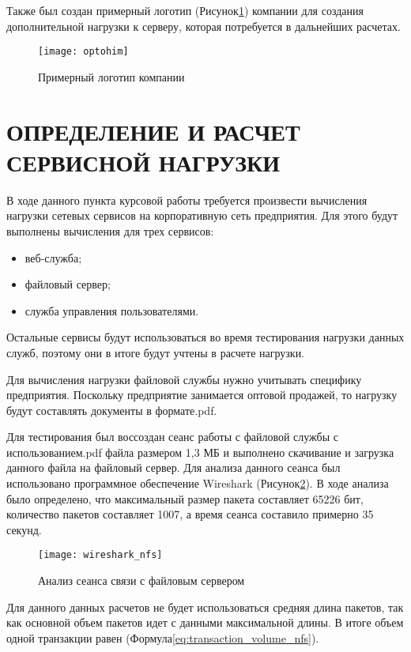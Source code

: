 \documentclass[14pt, a4paper]{extarticle}
\begin{document}
Также был создан примерный логотип (Рисунок\;\ref{fig:company_logo})
компании для создания дополнительной нагрузки к серверу, которая
потребуется в дальнейших расчетах.

\begin{figure}[H]
  \centering
  \texttt{[image: optohim]}
  \caption{Примерный логотип компании}
  \label{fig:company_logo}
\end{figure}

\section{ОПРЕДЕЛЕНИЕ И РАСЧЕТ СЕРВИСНОЙ НАГРУЗКИ}
В ходе данного пункта курсовой работы требуется произвести вычисления
нагрузки сетевых сервисов на корпоративную сеть предприятия. Для этого
будут выполнены вычисления для трех сервисов:
\begin{itemize}
\item веб-служба;
\item файловый сервер;
\item служба управления пользователями.
\end{itemize}

Остальные сервисы будут использоваться во время тестирования нагрузки
данных служб, поэтому они в итоге будут учтены в расчете нагрузки.

Для вычисления нагрузки файловой службы нужно учитывать специфику
предприятия. Поскольку предприятие занимается оптовой продажей, то
нагрузку будут составлять документы в формате\;.pdf.

Для тестирования был воссоздан сеанс работы с файловой службы с
использованием\;.pdf файла размером 1,3 МБ и выполнено скачивание и
загрузка данного файла на файловый сервер. Для анализа данного сеанса
был использовано программное обеспечение Wireshark
(Рисунок\;\ref{fig:wireshark_nfs}). В ходе анализа было определено,
что максимальный размер пакета составляет 65226 бит, количество
пакетов составляет 1007, а время сеанса составило примерно 35 секунд.

\begin{figure}[H]
  \centering
  \texttt{[image: wireshark\_nfs]}
  \caption{Анализ сеанса связи с файловым сервером}
  \label{fig:wireshark_nfs}
\end{figure}

Для данного данных расчетов не будет использоваться средняя длина
пакетов, так как основной объем пакетов идет с данными максимальной
длины. В итоге объем одной транзакции равен
(Формула\;\ref{eq:transaction_volume_nfs}).
\end{document}
